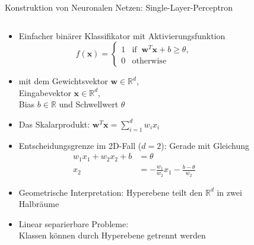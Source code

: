 \documentclass[aspectratio=1610, xcolor=dvipsnames, 9pt]{beamer}
\begin{document}
\begin{frame}{Konstruktion von Neuronalen Netzen: Single-Layer-Perceptron}
        \begin{columns}
          \begin{column}{0.7\textwidth}
            \begin{itemize}
              \item Einfacher binärer Klassifikator mit Aktivierungsfunktion
              \begin{equation}
                        f(\mathbf{x}) = \begin{cases}1 & \text{if }\ \mathbf{w}^T \mathbf{x} + b \geq \theta,\\0 & \text{otherwise}\end{cases}
                    \end{equation}
              \item mit dem Gewichtsvektor $\mathbf{w} \in \mathbb{R}^d$, \\
                    Eingabevektor $\mathbf{x} \in \mathbb{R}^d$, \\
                    Bias $b \in \mathbb{R}$ und Schwellwert $\theta$
              \item Das Skalarprodukt: $\mathbf{w}^T\mathbf{x} = \sum_{i=1}^{d} w_i x_i$
              \item Entscheidungsgrenze im 2D-Fall ($d=2$): Gerade mit Gleichung
              \begin{align}
                w_1 x_1 + w_2 x_2 + b &= \theta \\
                x_2 &= -\frac{w_1}{w_2} x_1 - \frac{b-\theta}{w_2}
              \end{align}
              \item Geometrische Interpretation: Hyperebene teilt den $\mathbb{R}^d$ in zwei Halbräume
              \item Linear separierbare Probleme: \\
                    Klassen können durch Hyperebene getrennt werden
            \end{itemize}
          \end{column}
          \begin{column}{0.3\textwidth}
       \begin{figure}
       \centering

\end{figure}
\end{column}
\end{columns}
\end{frame}
\end{document}
